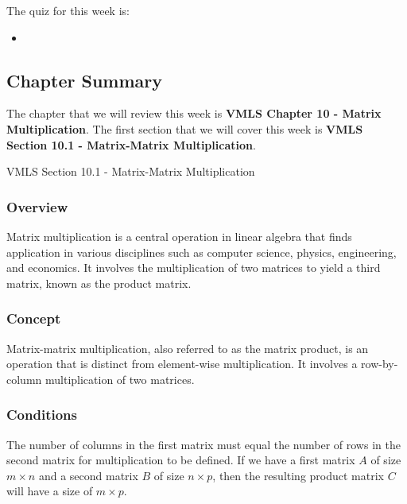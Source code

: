 The quiz for this week is:

\begin{itemize}
    \item {}
\end{itemize}

\subsection{Chapter Summary}

The chapter that we will review this week is \textbf{VMLS Chapter 10 - Matrix Multiplication}. The first section that we will cover this week is \textbf{VMLS Section 10.1 - Matrix-Matrix Multiplication}.

\begin{notes}{VMLS Section 10.1 - Matrix-Matrix Multiplication}
    \subsubsection*{Overview}

    Matrix multiplication is a central operation in linear algebra that finds application in various disciplines such as computer science, physics, engineering, and economics. It involves the 
    multiplication of two matrices to yield a third matrix, known as the product matrix. \vspace*{1em}

    \subsubsection*{Concept}
    Matrix-matrix multiplication, also referred to as the matrix product, is an operation that is distinct from element-wise multiplication. It involves a row-by-column multiplication of two 
    matrices. \vspace*{1em}
    
    \subsubsection*{Conditions}
    The number of columns in the first matrix must equal the number of rows in the second matrix for multiplication to be defined. If we have a first matrix $A$ of size $m \times n$ 
    and a second matrix $B$ of size $n \times p$, then the resulting product matrix $C$ will have a size of $m \times p$. \vspace*{1em}


\end{notes}
